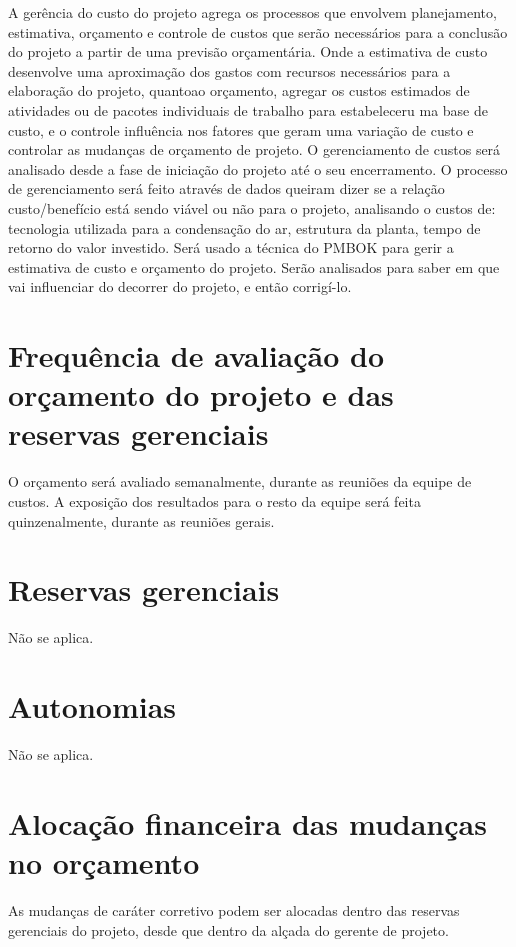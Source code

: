 A gerência do custo do projeto agrega os processos que envolvem planejamento, estimativa, orçamento e controle de custos que serão necessários para a conclusão do projeto a partir de uma previsão orçamentária. Onde a estimativa de custo desenvolve uma aproximação dos gastos com recursos necessários para a elaboração do projeto, quantoao orçamento, agregar os custos estimados de atividades ou de pacotes individuais de trabalho para estabeleceru ma base de custo, e o controle influência nos fatores que geram uma variação de custo e controlar as mudanças de orçamento de projeto. O gerenciamento de custos será analisado desde a fase de iniciação do projeto até o seu encerramento. O processo de gerenciamento será feito através de dados queiram dizer se a relação custo/benefício está sendo viável ou não para o projeto, analisando o custos de: tecnologia utilizada para a condensação do ar, estrutura da planta, tempo de retorno do valor investido. Será usado a técnica do PMBOK para gerir a estimativa de custo e orçamento do projeto. Serão analisados para saber em que vai influenciar do decorrer do projeto, e então corrigí-lo.

\section*{Frequência de avaliação do orçamento do projeto e das reservas gerenciais}   

O orçamento será avaliado semanalmente, durante as reuniões da equipe de custos. A exposição dos resultados para o resto da equipe será feita quinzenalmente, durante as reuniões gerais.

\section*{Reservas gerenciais}

Não se aplica.

\section*{Autonomias}

Não se aplica.

\section*{Alocação financeira das mudanças no orçamento}

As mudanças de caráter corretivo podem ser alocadas dentro das reservas gerenciais do projeto, desde que dentro da alçada do gerente de projeto.

